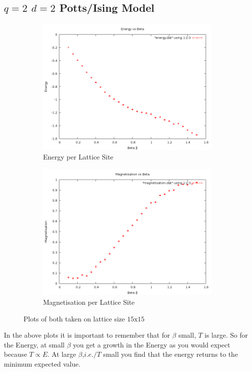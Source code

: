 \documentclass[10pt,a4paper]{article}
\begin{document}
\subsection{$q=2$ $d=2$ Potts/Ising Model}
\begin{figure}[H]
\centering
	\begin{subfigure}[b]{0.4\textwidth}
		\includegraphics[width=\textwidth]{energyvsbeta.png}	
		\caption{Energy per Lattice Site}
	\end{subfigure}
	\begin{subfigure}[b]{0.4\textwidth}
		\includegraphics[width=\textwidth]{magnetisationvsbeta.png}
		\caption{Magnetisation per Lattice Site}
	\end{subfigure}

\caption{Plots of both taken on lattice size $15 \textrm{x} 15$}
\end{figure}
In the above plots it is important to remember that for $\beta$ small, $T$ is large.
So for the Energy, at small $\beta$ you get a growth in the Energy as you would expect because $T \propto E$.
At large $\beta$,$i.e./ T$ small you find that the energy returns to the minimum expected value.
\end{document}
